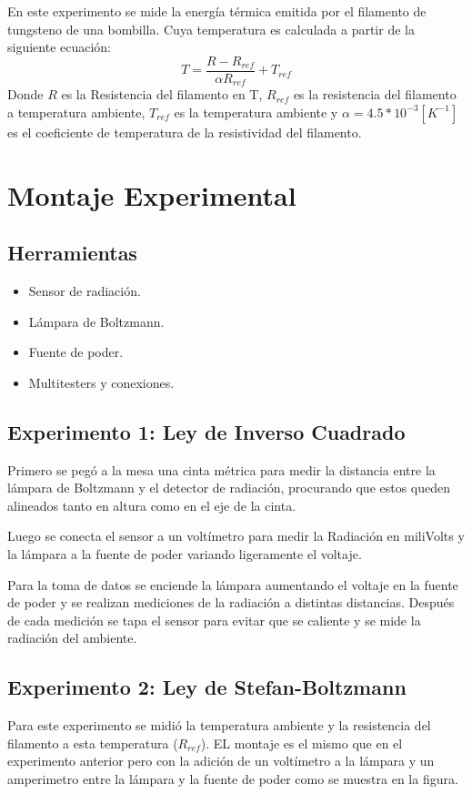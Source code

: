 \documentclass[a4paper,twocolumn,10pt]{article}
\begin{document}
En este experimento se mide la energía térmica emitida por el filamento de tungsteno de una bombilla. Cuya temperatura es calculada a partir de la siguiente ecuación:
\begin{equation}
    T=\frac{R-R_{ref}}{\alpha R_{ref}}+T_{ref}
\end{equation}
Donde $R$ es la Resistencia del filamento en T, $R_{ref}$ es la resistencia del filamento a temperatura ambiente, $T_{ref}$ es la temperatura ambiente y $\alpha = 4.5*10^{-3} [K^{-1}]$ es el coeficiente de temperatura de la resistividad del filamento.


\section{Montaje Experimental}
\subsection{Herramientas}
\begin{itemize} 
\item Sensor de radiación.
\item Lámpara de Boltzmann.
\item Fuente de poder.
\item Multitesters y conexiones.
\end{itemize}

\subsection{Experimento 1: Ley de Inverso Cuadrado}
Primero se pegó a la mesa una cinta métrica para medir la distancia entre la lámpara de Boltzmann y el detector de radiación, procurando que estos queden alineados tanto en altura como en el eje de la cinta.

Luego se conecta el sensor a un voltímetro para medir la Radiación en miliVolts y la lámpara a la fuente de poder variando ligeramente el voltaje.

Para la toma de datos se enciende la lámpara aumentando el voltaje en la fuente de poder y se realizan mediciones de la radiación a distintas distancias. Después de cada medición se tapa el sensor para evitar que se caliente y se mide la radiación del ambiente.

\subsection{Experimento 2: Ley de Stefan-Boltzmann}
Para este experimento se midió la temperatura ambiente y la resistencia del filamento a esta temperatura ($R_{ref}$).
EL montaje es el mismo que en el experimento anterior pero con la adición de un voltímetro a la lámpara y un amperimetro entre la lámpara y la fuente de poder como se muestra en la figura.
\end{document}
